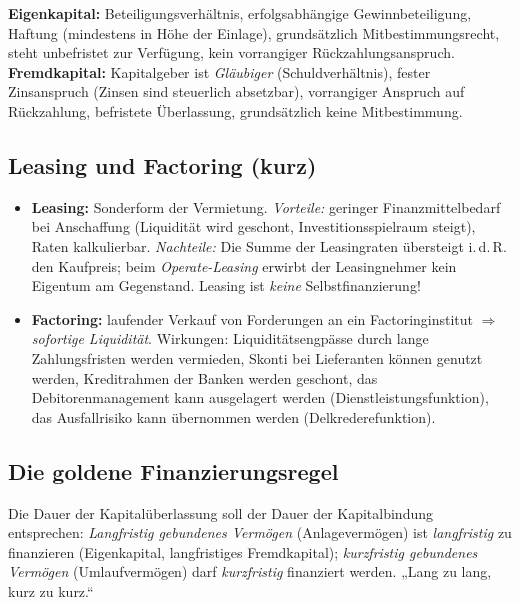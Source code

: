 \documentclass[11pt, a4paper]{article}
\begin{document}
\begin{merksatz}[title={\bfseries Eigenkapital vs. Fremdkapital --- typische Merkmale}]
\textbf{Eigenkapital:} Beteiligungsverhältnis, erfolgsabhängige Gewinnbeteiligung, Haftung
(mindestens in Höhe der Einlage), grundsätzlich Mitbestimmungsrecht, steht unbefristet zur
Verfügung, kein vorrangiger Rückzahlungsanspruch.\\[0.3em]
\textbf{Fremdkapital:} Kapitalgeber ist \emph{Gläubiger} (Schuldverhältnis), fester
Zinsanspruch (Zinsen sind steuerlich absetzbar), vorrangiger Anspruch auf Rückzahlung,
befristete Überlassung, grundsätzlich keine Mitbestimmung.
\end{merksatz}

\subsection{Leasing und Factoring (kurz)}

\begin{itemize}
  \item \textbf{Leasing:} Sonderform der Vermietung. \emph{Vorteile:} geringer
    Finanzmittelbedarf bei Anschaffung (Liquidität wird geschont, Investitionsspielraum
    steigt), Raten kalkulierbar. \emph{Nachteile:} Die Summe der Leasingraten übersteigt
    i.\,d.\,R. den Kaufpreis; beim \emph{Operate-Leasing} erwirbt der Leasingnehmer kein
    Eigentum am Gegenstand. Leasing ist \emph{keine} Selbstfinanzierung!
  \item \textbf{Factoring:} laufender Verkauf von Forderungen an ein Factoringinstitut
    $\Rightarrow$ \emph{sofortige Liquidität}. Wirkungen: Liquiditätsengpässe durch lange
    Zahlungsfristen werden vermieden, Skonti bei Lieferanten können genutzt werden,
    Kreditrahmen der Banken werden geschont, das Debitorenmanagement kann ausgelagert
    werden (Dienstleistungsfunktion), das Ausfallrisiko kann übernommen werden
    (Delkrederefunktion).
\end{itemize}

\subsection{Die goldene Finanzierungsregel}

\begin{merksatz}[title={\bfseries Goldene Finanzierungsregel (Fristenkongruenz)}]
Die Dauer der Kapitalüberlassung soll der Dauer der Kapitalbindung entsprechen:
\emph{Langfristig gebundenes Vermögen} (Anlagevermögen) ist \emph{langfristig} zu
finanzieren (Eigenkapital, langfristiges Fremdkapital); \emph{kurzfristig gebundenes
Vermögen} (Umlaufvermögen) darf \emph{kurzfristig} finanziert werden.
„Lang zu lang, kurz zu kurz.``
\end{merksatz}
\end{document}
